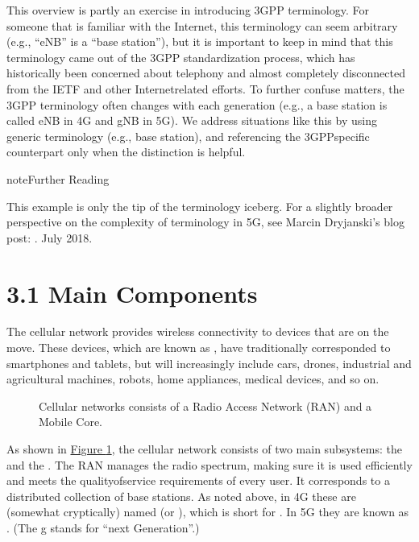 \documentclass[a4paper,11pt,english]{sphinxmanual}
\let\sphinxpxdimen\pdfpxdimen\else\newdimen\sphinxpxdimen
\begin{document}
\sphinxAtStartPar
This overview is partly an exercise in introducing 3GPP terminology. For
someone that is familiar with the Internet, this terminology can seem
arbitrary (e.g., “eNB” is a “base station”), but it is important to keep
in mind that this terminology came out of the 3GPP standardization
process, which has historically been concerned about telephony and
almost completely disconnected from the IETF and other Internet\sphinxhyphen{}related
efforts. To further confuse matters, the 3GPP terminology often changes
with each generation (e.g., a base station is called eNB in 4G and gNB
in 5G). We address situations like this by using generic terminology
(e.g., base station), and referencing the 3GPP\sphinxhyphen{}specific counterpart only
when the distinction is helpful.

\label{\detokenize{arch:reading-terminology}}
\begin{sphinxadmonition}{note}{Further Reading}

\sphinxAtStartPar
This example is only the tip of the terminology iceberg. For a
slightly broader perspective on the complexity of terminology in
5G, see Marcin Dryjanski’s blog post: .
July 2018.
\end{sphinxadmonition}


\section{3.1 Main Components}
\label{\detokenize{arch:main-components}}
\sphinxAtStartPar
The cellular network provides wireless connectivity to devices that are
on the move. These devices, which are known as ,
have traditionally corresponded to smartphones and tablets, but will
increasingly include cars, drones, industrial and agricultural machines,
robots, home appliances, medical devices, and so on.

\begin{figure}[ht]
\centering
\capstart

\noindent\sphinxincludegraphics[width=600\sphinxpxdimen]{{Slide01}.png}
\caption{Cellular networks consists of a Radio Access Network
(RAN) and a Mobile Core.}\label{\detokenize{arch:id2}}\label{\detokenize{arch:fig-cellular}}\end{figure}

\sphinxAtStartPar
As shown in \hyperref[\detokenize{arch:fig-cellular}]{Figure \ref{\detokenize{arch:fig-cellular}}}, the cellular network
consists of two main subsystems: the  and
the . The RAN manages the radio spectrum, making sure it
is used efficiently and meets the quality\sphinxhyphen{}of\sphinxhyphen{}service requirements of
every user.  It corresponds to a distributed collection of base
stations. As noted above, in 4G these are (somewhat cryptically) named
 (or ), which is short for .  In 5G they
are known as . (The g stands for “next Generation”.)
\end{document}
